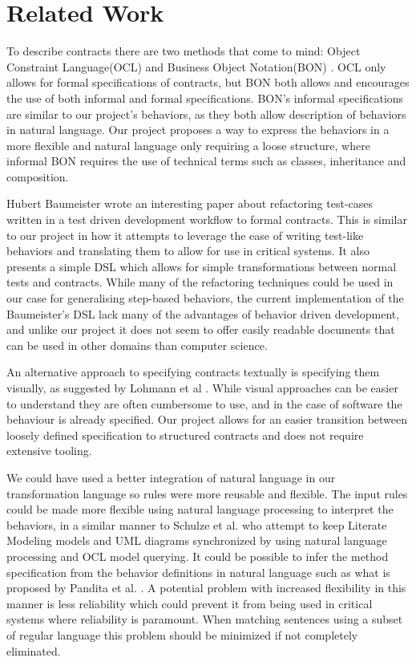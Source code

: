 \section{Related Work}
To describe contracts there are two methods that come to mind: Object Constraint Language(OCL) \cite{omg2010} and Business Object Notation(BON) \cite{walden1995}.
OCL only allows for formal specifications of contracts, but BON both allows and encourages the use of both informal and formal specifications.
BON's informal specifications are similar to our project's behaviors, as they both allow description of behaviors in natural language.
Our project proposes a way to express the behaviors in a more flexible and natural language only requiring a loose structure, where informal BON requires the use of technical terms such as classes, inheritance and composition.

Hubert Baumeister wrote an interesting paper \cite{baumeister2004} about refactoring test-cases written in a test driven development workflow to formal contracts.
This is similar to our project in how it attempts to leverage the ease of writing test-like behaviors and translating them to allow for use in critical systems.
It also presents a simple DSL which allows for simple transformations between normal tests and contracts.
While many of the refactoring techniques could be used in our case for generalising step-based behaviors, the current implementation of the Baumeister’s DSL lack many of the advantages of behavior driven development, and unlike our project it does not seem to offer easily readable documents that can be used in other domains than computer science.

An alternative approach to specifying contracts textually is specifying them visually, as suggested by Lohmann et al \cite{lohmann2006}. While visual approaches can be easier to understand they are often cumbersome to use, and in the case of software the behaviour is already specified.
Our project allows for an easier transition between loosely defined specification to structured contracts and does not require extensive tooling.

We could have used a better integration of natural language in our transformation language so rules were more reusable and flexible. 
The input rules could be made more flexible using natural language processing to interpret the behaviors, in a similar manner to Schulze et al. \cite{schulze2012} who attempt to keep Literate Modeling models and UML diagrams synchronized by using natural language processing and OCL model querying.
It could be possible to infer the method specification from the behavior definitions in natural language such as what is proposed by Pandita et al. \cite{pandita2012}.
A potential problem with increased flexibility in this manner is less reliability which could prevent it from being used in critical systems where reliability is paramount.
When matching sentences using a subset of regular language this problem should be minimized if not completely eliminated.